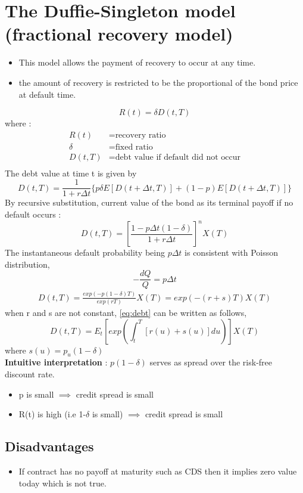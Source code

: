 \section{The Duffie-Singleton model (fractional recovery model) }
\begin{itemize}
    \item This model allows the payment of recovery to occur at any time.
    \item the amount of recovery is restricted to be the proportional of the bond price at default time.
\end{itemize}
\[ R(t)=\delta D(t,T) \]
where : \begin{align*}
R(t) &= \text{recovery ratio} \\
\delta &= \text{fixed ratio} \\
D(t,T) &= \text{debt value if default did not occur} \\
\end{align*}
The debt value at time t is given by 
\[ D(t,T)=\frac{1}{1+r\Delta t}\{ p\delta E[D(t+\Delta t,T)]+(1-p)E[D(t+\Delta t,T)]\} \]
By recursive substitution, current value of the bond as its terminal payoff if no default occurs : 
\[ D(t,T)= \left[\frac{1-p\Delta t(1-\delta)}{1+r\Delta t}\right] ^nX(T) \]
The instantaneous default probability being $p\Delta t$ is consistent with Poisson distribution,
\[ -\frac{dQ}{Q}=p\Delta t \]
\begin{align}
D(t,T)=\frac{exp(-p(1-\delta)T)}{exp(rT)}X(T) = exp(-(r+s)T)X(T)\label{eq:debt}
\end{align}
when r and s are not constant, \ref{eq:debt} can be written as follows,
\[D(t,T)=E_t\left[exp\left(\int_{t}^{T}[r(u)+s(u)]du\right)\right]X(T)\]
where $ s(u) = p_u(1-\delta) $ \\
\textbf{Intuitive interpretation} : $p(1-\delta)$ serves as spread over the risk-free discount rate.
\begin{itemize}
    \item p is small $\implies$ credit spread is small
    \item R(t) is high (i.e 1-$\delta$ is small) $\implies$ credit spread is small
\end{itemize}
\subsection{Disadvantages}
\begin{itemize}
    \item If contract has no payoff at maturity such as CDS then it implies zero value today which is not true.
\end{itemize}

